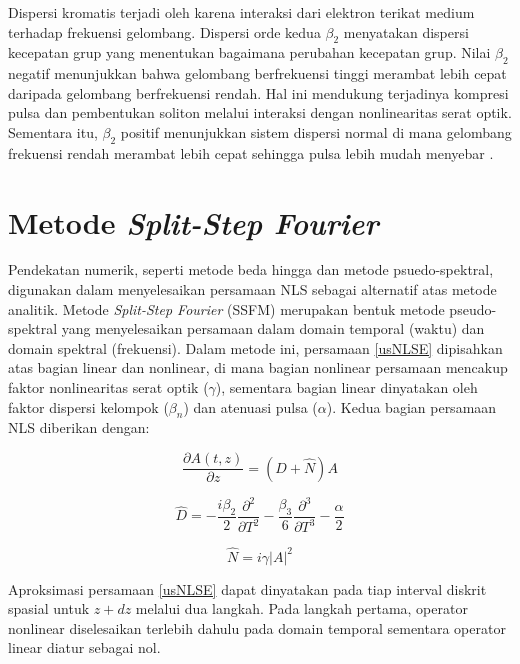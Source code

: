 Dispersi kromatis terjadi oleh karena interaksi dari elektron terikat medium terhadap frekuensi gelombang. Dispersi orde kedua $\beta_2$ menyatakan dispersi kecepatan grup yang menentukan bagaimana perubahan kecepatan grup. Nilai $\beta_2$ negatif menunjukkan bahwa gelombang berfrekuensi tinggi merambat lebih cepat daripada gelombang berfrekuensi rendah. Hal ini mendukung terjadinya kompresi pulsa dan pembentukan soliton melalui interaksi dengan nonlinearitas serat optik. Sementara itu, $\beta_2$ positif menunjukkan sistem dispersi normal di mana gelombang frekuensi rendah merambat lebih cepat sehingga pulsa lebih mudah menyebar .

\section{Metode \emph{Split-Step Fourier}}
Pendekatan numerik, seperti metode beda hingga dan metode psuedo-spektral, digunakan dalam menyelesaikan persamaan NLS sebagai alternatif atas metode analitik. Metode \emph{Split-Step Fourier} (SSFM) merupakan bentuk metode pseudo-spektral yang menyelesaikan persamaan dalam domain temporal (waktu) dan domain spektral (frekuensi). Dalam metode ini, persamaan \eqref{usNLSE} dipisahkan atas bagian linear dan nonlinear, di mana bagian nonlinear persamaan mencakup faktor nonlinearitas serat optik ($\gamma$), sementara bagian linear dinyatakan oleh faktor dispersi kelompok ($\beta_n$) dan atenuasi pulsa ($\alpha$). Kedua bagian persamaan NLS diberikan dengan:

\begin{equation}
    \label{splitNLSE}
    \frac{\partial A(t,z)}{\partial z} = (\hat{D}+\hat{N})A
\end{equation}

\begin{equation}
    \label{linear}
    \hat{D} = -\frac{i\beta_2}{2}\frac{\partial^2}{\partial T^2} -\frac{\beta_3}{6}\frac{\partial^3}{\partial T^3} - \frac{\alpha}{2}
\end{equation}

\begin{equation}
    \label{nonlinear}
    \hat{N} = i\gamma|A|^2
\end{equation}

Aproksimasi persamaan \eqref{usNLSE} dapat dinyatakan pada tiap interval diskrit spasial untuk \(z+dz\) melalui dua langkah. Pada langkah pertama, operator nonlinear diselesaikan terlebih dahulu pada domain temporal sementara operator linear diatur sebagai nol.


